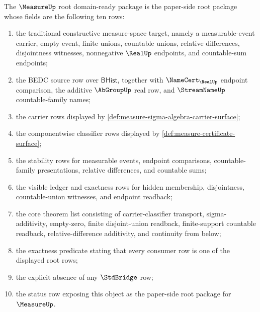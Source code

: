 \begin{definition}
\label{def:measure-root-domain-ready-package}
The $\MeasureUp$ root domain-ready package is the paper-side root package
whose fields are the following ten rows:
\begin{enumerate}
  \item the traditional constructive measure-space target, namely a
  measurable-event carrier, empty event, finite unions, countable unions,
  relative differences, disjointness witnesses, nonnegative $\RealUp$
  endpoints, and countable-sum endpoints;
  \item the BEDC source row over $\mathsf{BHist}$, together with
  $\NameCert_{\RealUp}$ endpoint comparison, the additive $\AbGroupUp$ real
  row, and $\StreamNameUp$ countable-family names;
  \item the carrier rows displayed by
  \autoref{def:measure-sigma-algebra-carrier-surface};
  \item the componentwise classifier rows displayed by
  \autoref{def:measure-certificate-surface};
  \item the stability rows for measurable events, endpoint comparisons,
  countable-family presentations, relative differences, and countable sums;
  \item the visible ledger and exactness rows for hidden membership,
  disjointness, countable-union witnesses, and endpoint readback;
  \item the core theorem list consisting of carrier-classifier transport,
  sigma-additivity, empty-zero, finite disjoint-union readback,
  finite-support countable readback, relative-difference additivity, and
  continuity from below;
  \item the exactness predicate stating that every consumer row is one of the
  displayed root rows;
  \item the explicit absence of any $\StdBridge$ row;
  \item the status row exposing this object as the paper-side root package
  for $\MeasureUp$.
\end{enumerate}
\end{definition}

